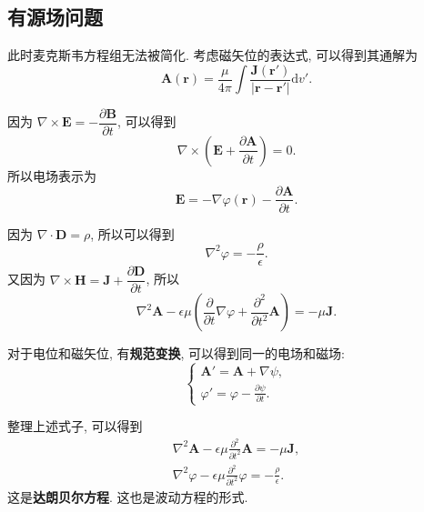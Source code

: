 \subsection{有源场问题}
此时麦克斯韦方程组无法被简化. 考虑磁矢位的表达式, 可以得到其通解为
\begin{equation}
    \bm{A}(\bm{r})=\frac{\mu}{4\pi}\int\frac{\bm{J}(\bm{r'})}{|\bm{r}-\bm{r'}|}\mathrm{d}v'.
\end{equation}

因为 $\nabla\times\bm{E}=-\dfrac{\partial\bm{B}}{\partial t}$, 可以得到
\begin{equation}
    \nabla\times\left(\bm{E}+\frac{\partial\bm{A}}{\partial t}\right)=0.
\end{equation}
所以电场表示为
\begin{equation}
    \bm{E}=-\nabla\varphi(\bm{r})-\frac{\partial\bm{A}}{\partial t}.
\end{equation}

因为 $\nabla\cdot\bm{D}=\rho$, 所以可以得到
\begin{equation}
    \nabla^2\varphi=-\frac{\rho}{\epsilon}.
\end{equation}
又因为 $\nabla\times\bm{H}=\bm{J}+\dfrac{\partial\bm{D}}{\partial t}$, 所以
\begin{equation}
    \nabla^2\bm{A}-\epsilon\mu\left(\frac{\partial}{\partial t}\nabla\varphi+\frac{\partial^2}{\partial t^2}\bm{A}\right)=-\mu\bm{J}.
\end{equation}

对于电位和磁矢位, 有\textbf{规范变换}, 可以得到同一的电场和磁场:
\begin{equation}
    \begin{cases}
        \bm{A'}=\bm{A}+\nabla\psi, \\
        \varphi'=\varphi-\frac{\partial\psi}{\partial t}.
    \end{cases}
\end{equation}

整理上述式子, 可以得到
\begin{gather}
    \nabla^2\bm{A}-\epsilon\mu\frac{\partial^2}{\partial t^2}\bm{A}=-\mu\bm{J}, \\
    \nabla^2\varphi-\epsilon\mu\frac{\partial^2}{\partial t^2}\varphi=-\frac{\rho}{\epsilon}.
\end{gather}
这是\textbf{达朗贝尔方程}. 这也是波动方程的形式.
